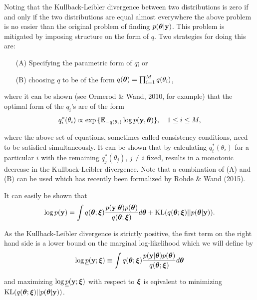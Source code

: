\documentclass{amsart}[12pt]
\begin{document}
\noindent Noting that the Kullback-Leibler divergence between two distributions is zero if and only if
the two distributions are equal almost everywhere the above problem is no easier than the original problem
of finding $p({\boldsymbol \theta}|{\bf y})$. This problem is mitigated by imposing structure on the form of $q$. Two
strategies for doing this are:
\begin{enumerate}
	\item[(A)] Specifying the parametric form of $q$; or 
	\item[(B)] choosing $q$ to be of the form $q({\boldsymbol \theta}) = \prod_{i=1}^M q(\theta_i)$,
\end{enumerate}

\noindent where it can be shown (see Ormerod \& Wand, 2010, for example) that the optimal form of the
$q_i$'s are of the form
\begin{equation}\label{eq:consistency}
	q_i^*(\theta_i) \propto \exp{\{ {\mathbb E}_{-q(\theta_i)} \log p({\bf y}, {\boldsymbol\theta}) \}},  \quad 1\le i\le M,
\end{equation}

\noindent where the above set of equations, sometimes called consistency conditions, need to be 
satisfied simultaneously. It can be shown that by calculating $q_i^*(\theta_i)$ for a particular
$i$ with the remaining $q_j^*(\theta_j)$, $j\ne i$ fixed, results in a monotonic decrease in the 
Kullback-Leibler divergence. Note that a combination of (A) and (B) can be used which has recently
been formalized by Rohde \& Wand (2015). 

\noindent It can easily be shown that
$$
\displaystyle \log p({\bf y}) = \int q({\boldsymbol \theta};{\boldsymbol \xi})\frac{p({\bf y}|{\boldsymbol \theta})p({\boldsymbol \theta})}{q({\boldsymbol \theta};{\boldsymbol \xi})} d{\boldsymbol \theta} + \text{KL}(q({\boldsymbol \theta};{\boldsymbol \xi})||p({\boldsymbol \theta}|{\bf y})).
$$

\noindent As the Kullback-Leibler divergence is strictly positive, the first term on the right hand side
is a lower bound on the marginal log-likelihood which we will define by
$$
\displaystyle \log \underline{p}({\bf y};{\boldsymbol \xi}) \equiv \int q({\boldsymbol \theta};{\boldsymbol \xi})\frac{p({\bf y}|{\boldsymbol \theta})p({\boldsymbol \theta})}{q({\boldsymbol \theta};{\boldsymbol \xi})} d{\boldsymbol \theta}
$$

\noindent and maximizing $\log \underline{p}({\bf y};{\boldsymbol \xi})$ with respect to ${\boldsymbol \xi}$ is eqivalent to minimizing
$\text{KL}(q({\boldsymbol \theta};{\boldsymbol \xi})||p({\boldsymbol \theta}|{\bf y}))$.

\end{document}
